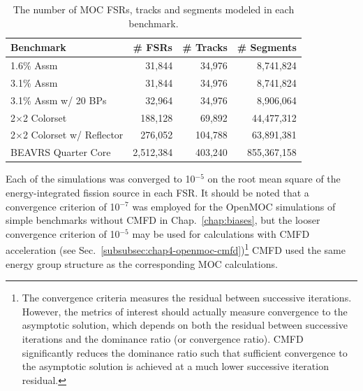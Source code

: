 \begin{table}[h!]
  \centering
  \caption[Number of \ac{FSR}s, tracks and segments for each heterogeneous benchmark]{The number of \ac{MOC} \ac{FSR}s, tracks and segments modeled in each benchmark.}
  \small
  \label{table:chap8-num-fsrs-tracks-segments}
  \vspace{6pt}
  \begin{tabular}{l r r r}
  \toprule
  \rowcolor{lightgray}
  \textbf{Benchmark} &
  \multicolumn{1}{c}{\cellcolor{lightgray} \textbf{\# \ac{FSR}s}} &
  \multicolumn{1}{c}{\cellcolor{lightgray} \textbf{\# Tracks}} &
  \multicolumn{1}{c}{\cellcolor{lightgray} \textbf{\# Segments}} \\
  \midrule
1.6\% Assm & 31,844 & 34,976 & 8,741,824 \\
  \midrule
3.1\% Assm & 31,844 & 34,976 & 8,741,824 \\
  \midrule
3.1\% Assm w/ 20 BPs & 32,964 & 34,976 & 8,906,064  \\
  \midrule
2$\times$2 Colorset & 188,128 & 69,892 & 44,477,312 \\
  \midrule
2$\times$2 Colorset w/ Reflector & 276,052 & 104,788 & 63,891,381 \\
  \midrule
\ac{BEAVRS} Quarter Core & 2,512,384 & 403,240 & 855,367,158 \\
  \bottomrule
\end{tabular}
\end{table}

Each of the simulations was converged to 10$^{-5}$ on the root mean square of the energy-integrated fission source in each \ac{FSR}. It should be noted that a convergence criterion of 10$^{-7}$ was employed for the OpenMOC simulations of simple benchmarks without \ac{CMFD} in Chap.~\ref{chap:biases}, but the looser convergence criterion of 10$^{-5}$ may be used for calculations with \ac{CMFD} acceleration (see Sec.~\ref{subsubsec:chap4-openmoc-cmfd})\footnote{The convergence criteria measures the residual between successive iterations. However, the metrics of interest should actually measure convergence to the asymptotic solution, which depends on both the residual between successive iterations and the dominance ratio (or convergence ratio). \ac{CMFD} significantly reduces the dominance ratio such that sufficient convergence to the asymptotic solution is achieved at a much lower successive iteration residual.} \ac{CMFD} used the same energy group structure as the corresponding \ac{MOC} calculations.

